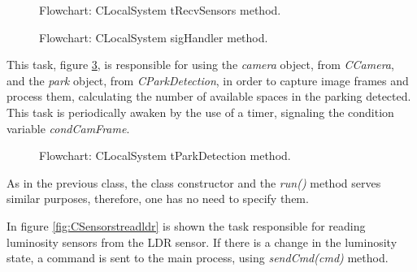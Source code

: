 \begin{figure}[H]
	\centering
	\caption{Flowchart: CLocalSystem tRecvSensors method.}
	\label{fig:CLocalSystemtRecvSensors}
\end{figure}

\begin{figure}[H]
	\centering
	\caption{Flowchart: CLocalSystem sigHandler method.}
	\label{fig:CLocalSystemsigHandler}
\end{figure}

This task, figure \ref{fig:CLocalSystemtParkDetection}, is responsible for using the \textit{camera} object, from \textit{CCamera}, and the \textit{park} object, from \textit{CParkDetection}, in order to capture image frames and process them, calculating the number of available spaces in the parking detected. This task is periodically awaken by the use of a timer, signaling the condition variable \textit{condCamFrame}.

%


\begin{figure}[H]
	\centering
	\caption{Flowchart: CLocalSystem tParkDetection method.}
	\label{fig:CLocalSystemtParkDetection}
\end{figure}

\clearpage
{}

As in the previous class, the class constructor and the \textit{run()} method serves similar purposes, therefore, one has no need to specify them.\linebreak

In figure \ref{fig:CSensorstreadldr} is shown the task responsible for reading luminosity sensors from the LDR sensor. If there is a change in the luminosity state, a command is sent to the main process, using \textit{sendCmd(cmd)} method.

